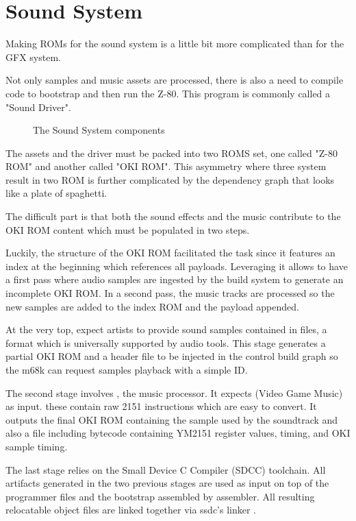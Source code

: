 \chapter{Sound System}
Making ROMs for the sound system is a little bit more complicated than for the GFX system. 

Not only samples and music assets are processed, there is also a need to compile code to bootstrap and then run the Z-80. This program is commonly called a "Sound Driver".

\begin{figure}[H]
\caption*{The Sound System components}
\end{figure}

The assets and the driver must be packed into two ROMS set, one called "Z-80 ROM" and another called "OKI ROM". This asymmetry where three system result in two ROM is further complicated by the dependency graph that looks like a plate of spaghetti. 

The difficult part is that both the sound effects and the music contribute to the OKI ROM content which must be populated in two steps.




Luckily, the structure of the OKI ROM facilitated the task since it features an index at the beginning which references all payloads. Leveraging it allows to have a first pass where audio samples are ingested by the build system to generate an incomplete OKI ROM. In a second pass, the music tracks are processed so the new samples are added to the index ROM and the payload appended.

At the very top,  expect artists to provide sound samples contained in  files, a format which is universally supported by audio tools. This stage generates a partial OKI ROM and a  header file to be injected in the control build graph so the m68k can request samples playback with a simple ID.

The second stage involves , the music processor. It expects  (Video Game Music) as input. these contain raw 2151 instructions which are easy to convert. It outputs the final OKI ROM containing the sample used by the soundtrack and also a  file including bytecode containing YM2151 register values, timing, and OKI sample timing.

The last stage relies on the Small Device C Compiler (SDCC) toolchain. All artifacts generated in the two previous stages are used as input on top of the programmer  files and the bootstrap  assembled by  assembler. All resulting relocatable object files  are linked together via ssdc's linker . 


